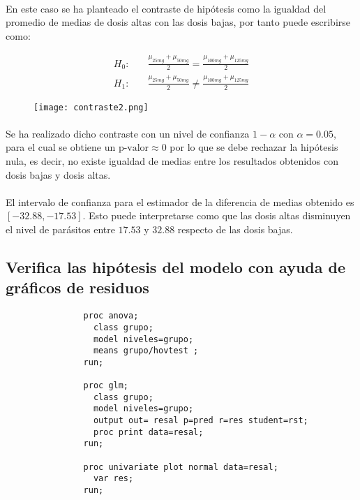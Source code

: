 \documentclass{article}
\begin{document}
      \paragraph{}
      En este caso se ha planteado el contraste de hipótesis como la igualdad del promedio de medias de dosis altas con las dosis bajas, por tanto puede escribirse como:

      \begin{align*}
        H_0:& \quad \frac{\mu_{25mg} + \mu_{50mg}}{2} = \frac{\mu_{100mg} +\mu_{125mg}}{2} \\
        H_1:& \quad \frac{\mu_{25mg} + \mu_{50mg}}{2} \neq \frac{\mu_{100mg} +\mu_{125mg}}{2}
      \end{align*}

      \begin{figure}[H]
        \centering
        \texttt{[image: contraste2.png]}
      \end{figure}

      \paragraph{}
      Se ha realizado dicho contraste con un nivel de confianza $1-\alpha$ con $\alpha = 0.05 $, para el cual se obtiene un $\text{p-valor}\approx 0$ por lo que se debe rechazar la hipótesis nula, es decir, no existe igualdad de medias entre los resultados obtenidos con dosis bajas y dosis altas.

      \paragraph{}
      El intervalo de confianza para el estimador de la diferencia de medias obtenido es $[-32.88, -17.53]$. Esto puede interpretarse como que las dosis altas disminuyen el nivel de parásitos entre $17.53$ y $32.88$ respecto de las dosis bajas.

    \subsection{Verifica las hipótesis del modelo con ayuda de gráficos de residuos}

      \begin{figure}[h]
        \centering
        \begin{verbatim}
          proc anova;
            class grupo;
            model niveles=grupo;
            means grupo/hovtest ;
          run;

          proc glm;
            class grupo;
            model niveles=grupo;
            output out= resal p=pred r=res student=rst;
            proc print data=resal;
          run;

          proc univariate plot normal data=resal;
            var res;
          run;
        \end{verbatim}
        \label{code:sas_8}
      \end{figure}
\end{document}
